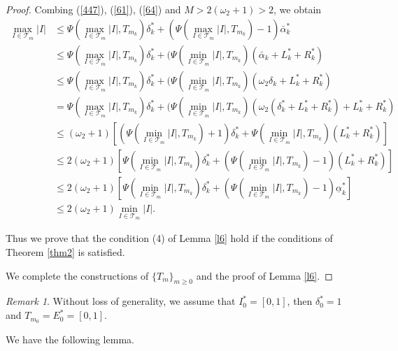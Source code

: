 \documentclass[reqno]{amsart}
\theoremstyle{plain}
\theoremstyle{definition}
\theoremstyle{remark}
\newtheorem{rem}{Remark}
\numberwithin{equation}{section} \DeclareMathOperator\intr{int}
\begin{document}
\begin{proof}
Combing (\ref{447}), (\ref{61}),  (\ref{64}) and $M>2(\omega_{2}+1)>2$, we obtain
\begin{equation}
\begin{aligned}
\max_{I\in\mathcal{T}_{m} }\left | I \right |&\le \Psi (\max_{I\in\mathcal{T}_{m} }\left | I \right |,T_{m_{k}})\delta^*_k+(\Psi (\max_{I\in\mathcal{T}_{m} }\left | I \right |,T_{m_{k}})-1)\bar{\alpha}^*_k\\&\le\Psi (\max_{I\in\mathcal{T}_{m} }\left | I \right |,T_{m_{k}})\delta^*_k+(\Psi (\min_{I\in\mathcal{T}_{m} }\left | I \right |,T_{m_{k}})(\bar{\alpha}_k+L^*_k+R^*_k)\\&\le \Psi (\max_{I\in\mathcal{T}_{m} }\left | I \right |,T_{m_{k}})\delta^*_k+(\Psi (\min_{I\in\mathcal{T}_{m} }\left | I \right |,T_{m_{k}})(\omega_{2} \delta_k+L^*_k+R^*_k)\\&=\Psi (\max_{I\in\mathcal{T}_{m} }\left | I \right |,T_{m_{k}})\delta^*_k+(\Psi (\min_{I\in\mathcal{T}_{m} }\left | I \right |,T_{m_{k}})(\omega_{2} (\delta^*_k+L^*_k+R^*_k)+L^*_k+R^*_k) \\
&\le (\omega_{2}+1)[(\Psi (\min_{I\in\mathcal{T}_{m} }\left | I \right |,T_{m_{k}})+1)\delta^*_k+\Psi (\min_{I\in\mathcal{T}_{m} }\left | I \right |,T_{m_{k}})(L^*_k+R^*_k)]\\
&\le 2(\omega_{2}+1)[\Psi (\min_{I\in\mathcal{T}_{m} }\left | I \right |,T_{m_{k}})\delta^*_k+(\Psi (\min_{I\in\mathcal{T}_{m} }\left | I \right |,T_{m_{k}})-1)(L^*_k+R^*_k)]\\
&\le 2(\omega_{2}+1)[\Psi (\min_{I\in\mathcal{T}_{m} }\left | I \right |,T_{m_{k}})\delta^*_k+(\Psi (\min_{I\in\mathcal{T}_{m} }\left | I \right |,T_{m_{k}})-1)\underline{\alpha}^*_k]\\
&\le 2(\omega_{2}+1)\min_{I\in\mathcal{T}_{m} }\left | I \right |.\nonumber
\end{aligned}
\end{equation}

Thus we prove that the condition (4) of Lemma \ref{l6}  hold if the conditions of Theorem \ref{thm2} is satisfied.

We complete the constructions of  $\{T_m\}_{m\ge0}$ and the proof of Lemma \ref{l6}.

\end{proof}
\bigskip

\begin{rem}
Without loss of generality, we  assume that $I_{0}^{*}=[0,1]$, then $\delta^*_{0}=1$ and $T_{m_{0}}=E_{0}^{*}=[0,1]$.
\end{rem}
\bigskip
We have the following lemma.
\end{document}
